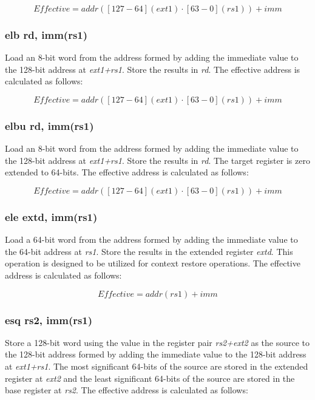 \documentclass{article}
\begin{document}
\begin{equation}
Effective = addr([127-64](ext1) \cdot [63-0](rs1))+imm
\end{equation}

\subsubsection{elb rd, imm(rs1)}
Load an 8-bit word from the address formed by adding the immediate value to the 
128-bit address at \textit{ext1+rs1}.  Store the results in \textit{rd}.  The effective 
address is calculated as follows: 

\begin{equation}
Effective = addr([127-64](ext1) \cdot [63-0](rs1))+imm
\end{equation}

\subsubsection{elbu rd, imm(rs1)}
Load an 8-bit word from the address formed by adding the immediate value to the 
128-bit address at \textit{ext1+rs1}.  Store the results in \textit{rd}.  
 The target register is zero extended to 64-bits.  The effective 
address is calculated as follows: 

\begin{equation}
Effective = addr([127-64](ext1) \cdot [63-0](rs1))+imm
\end{equation}

\subsubsection{ele extd, imm(rs1)}
Load a 64-bit word from the address formed by adding the immediate value to the 
64-bit address at \textit{rs1}.  Store the results in the extended register \textit{extd}.  
This operation is designed to be utilized for context restore operations.  The effective 
address is calculated as follows: 

\begin{equation}
Effective = addr(rs1)+imm
\end{equation}

\subsubsection{esq rs2, imm(rs1)}
Store a 128-bit word using the value in the register pair \textit{rs2+ext2} 
as the source to the 128-bit address formed by adding the immediate value to 
the 128-bit address at \textit{ext1+rs1}.  The most significant 64-bits of the source 
are stored in the extended register at \textit{ext2} and the least significant 64-bits of the source 
are stored in the base register at \textit{rs2}.  The effective address is calculated 
as follows:  
\end{document}
